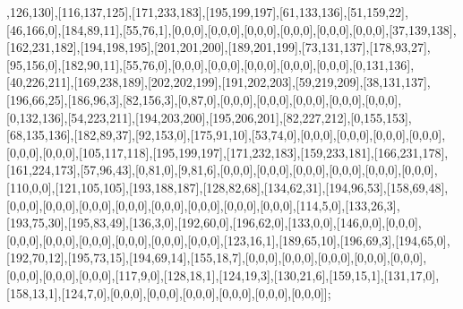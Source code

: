 ,126,130],[116,137,125],[171,233,183],[195,199,197],[61,133,136],[51,159,22],[46,166,0],[184,89,11],[55,76,1],[0,0,0],[0,0,0],[0,0,0],[0,0,0],[0,0,0],[0,0,0],[37,139,138],[162,231,182],[194,198,195],[201,201,200],[189,201,199],[73,131,137],[178,93,27],[95,156,0],[182,90,11],[55,76,0],[0,0,0],[0,0,0],[0,0,0],[0,0,0],[0,0,0],[0,131,136],[40,226,211],[169,238,189],[202,202,199],[191,202,203],[59,219,209],[38,131,137],[196,66,25],[186,96,3],[82,156,3],[0,87,0],[0,0,0],[0,0,0],[0,0,0],[0,0,0],[0,0,0],[0,132,136],[54,223,211],[194,203,200],[195,206,201],[82,227,212],[0,155,153],[68,135,136],[182,89,37],[92,153,0],[175,91,10],[53,74,0],[0,0,0],[0,0,0],[0,0,0],[0,0,0],[0,0,0],[0,0,0],[105,117,118],[195,199,197],[171,232,183],[159,233,181],[166,231,178],[161,224,173],[57,96,43],[0,81,0],[9,81,6],[0,0,0],[0,0,0],[0,0,0],[0,0,0],[0,0,0],[0,0,0],[110,0,0],[121,105,105],[193,188,187],[128,82,68],[134,62,31],[194,96,53],[158,69,48],[0,0,0],[0,0,0],[0,0,0],[0,0,0],[0,0,0],[0,0,0],[0,0,0],[0,0,0],[114,5,0],[133,26,3],[193,75,30],[195,83,49],[136,3,0],[192,60,0],[196,62,0],[133,0,0],[146,0,0],[0,0,0],[0,0,0],[0,0,0],[0,0,0],[0,0,0],[0,0,0],[0,0,0],[123,16,1],[189,65,10],[196,69,3],[194,65,0],[192,70,12],[195,73,15],[194,69,14],[155,18,7],[0,0,0],[0,0,0],[0,0,0],[0,0,0],[0,0,0],[0,0,0],[0,0,0],[0,0,0],[117,9,0],[128,18,1],[124,19,3],[130,21,6],[159,15,1],[131,17,0],[158,13,1],[124,7,0],[0,0,0],[0,0,0],[0,0,0],[0,0,0],[0,0,0],[0,0,0]];


